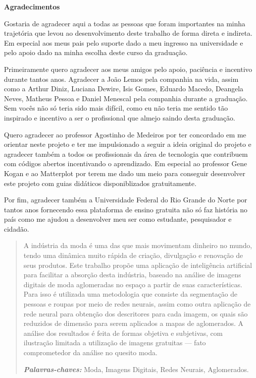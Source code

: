 \documentclass[12pt]{report}
\providecommand{\palavrasChaves}[1]{\textbf{\textit{Palavras-chaves: }} #1}
\begin{document}




\begin{center}
{\bf \Large Agradecimentos}
\end{center}

Gostaria de agradecer aqui a todas as pessoas que foram importantes na minha trajetória que levou ao desenvolvimento deste trabalho de forma direta e indireta. Em especial aos meus pais pelo suporte dado a meu ingresso na universidade e pelo apoio dado na minha escolha deste curso da graduação.

Primeiramente quero agradecer aos meus amigos pelo apoio, paciência e incentivo durante tantos anos. Agradecer a João Lemos pela companhia na vida, assim como a Arthur Diniz, Luciana Dewire, Isis Gomes, Eduardo Macedo, Deangela Neves, Matheus Pessoa e Daniel Menescal pela companhia durante a graduação. Sem vocês não só teria sido mais difícil, como eu não teria me sentido tão inspirado e incentivo a ser o profissional que almejo saindo desta graduação. 

Quero agradecer ao professor Agostinho de Medeiros por ter concordado em me orientar neste projeto e ter me impulsionado a seguir a ideia original do projeto e agradecer também a todos os profissionais da área de tecnologia que contribuem com códigos abertos incentivando o aprendizado. Em especial ao professor Gene Kogan e ao Matterplot por terem me dado um meio para conseguir desenvolver este projeto com guias didáticos disponiblizados gratuitamente.

Por fim, agradecer também a Universidade Federal do Rio Grande do Norte por tantos anos fornecendo essa plataforma de ensino gratuita não só faz história no país como me ajudou a desenvolver meu ser como estudante, pesquisador e cidadão. 

\newpage

\begin{abstract}

A indústria da moda é uma das que mais movimentam dinheiro no mundo, tendo uma dinâmica muito rápida de criação, divulgação e renovação de seus produtos. Este trabalho propõe uma aplicação de inteligência artificial para facilitar a absorção desta indústria, baseado na análise de imagens digitais de moda aglomeradas no espaço a partir de suas características. Para isso é utilizada uma metodologia que consiste da segmentação de pessoas e roupas por meio de redes neurais, assim como outra aplicação de rede neural para obtenção dos descritores para cada imagem, os quais são reduzidos de dimensão para serem aplicados a mapas de aglomerados. A análise dos resultados é feita de formas objetiva e subjetivas, com ilustração limitada a utilização de imagens gratuitas --- fato comprometedor da análise no quesito moda. 


  \palavrasChaves{Moda, Imagens Digitais, Redes Neurais, Aglomerados.}
    
\end{abstract}
\end{document}
